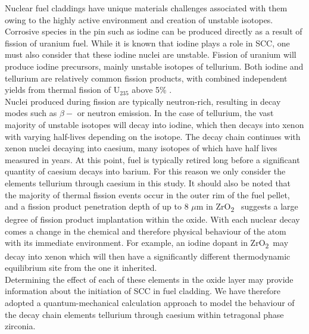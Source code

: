 \documentclass[11pt,a4paper]{article}
\newcommand{\zirconia}{ZrO\textsubscript{2}}
\begin{document}
Nuclear fuel claddings have unique materials challenges associated with them owing to the highly active environment and creation of unstable isotopes. Corrosive species in the pin such as iodine can be produced directly as a result of fission of uranium fuel. While it is known that iodine plays a role in SCC, one must also consider that these iodine nuclei are unstable. Fission of uranium will produce iodine precursors, mainly unstable isotopes of tellurium. Both iodine and tellurium are relatively common fission products, with combined independent yields from thermal fission of U$_{235}$ above 5\% \cite{kennett1956mass, iodine129fissionyield, imanishi1976independent, iaeafissionyield, iodine132, amiel1975odd}. \\ 

Nuclei produced during fission are typically neutron-rich, resulting in decay modes such as $\beta-$ or neutron emission. In the case of tellurium, the vast majority of unstable isotopes will decay into iodine, which then decays into xenon with varying half-lives depending on the isotope. The decay chain continues with xenon nuclei decaying into caesium, many isotopes of which have half lives measured in years. At this point, fuel is typically retired long before a significant quantity of caesium decays into barium. For this reason we only consider the elements tellurium through caesium in this study. It should also be noted that the majority of thermal fission events occur in the outer rim of the fuel pellet, and a fission product penetration depth of up to 8 $\mu$m in \zirconia\ \cite{degueldre2001behaviour} suggests a large degree of fission product implantation within the oxide. With each nuclear decay comes a change in the chemical and therefore physical behaviour of the atom with its immediate environment. For example, an iodine dopant in \zirconia\ may decay into xenon which will then have a significantly different thermodynamic equilibrium site from the one it inherited.   \\

Determining the effect of each of these elements in the oxide layer may provide information about the initiation of SCC in fuel cladding. We have therefore adopted a quantum-mechanical calculation approach to model the behaviour of the decay chain elements tellurium through caesium within tetragonal phase zirconia. \\
\end{document}
